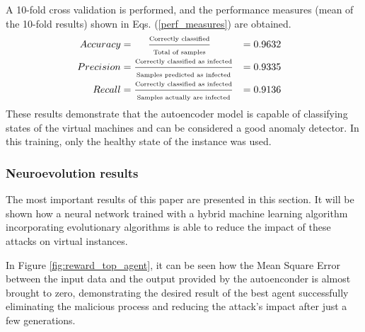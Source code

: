 \documentclass{iosart2c}
\begin{document}
A 10-fold cross validation is performed, and the performance measures (mean of the 10-fold results) shown in Eqs. (\ref{perf_measures}) are obtained.
\begin{eqnarray}\label{perf_measures}
\begin{aligned}
\hspace{-0.3cm} Accuracy  &= \hspace{0.5cm} \frac{\text{\tiny{Correctly classified}}}{\text{\tiny{Total of samples}}}           &= 0.9632 \\
\hspace{-0.3cm} Precision &=\frac{\text{\tiny{Correctly classified as infected}}}{\text{\tiny{Samples predicted as infected}}} &= 0.9335\\
\hspace{-0.3cm} Recall    &=\frac{\text{\tiny{Correctly classified as infected}}}{\text{\tiny{Samples actually are infected}}} &= 0.9136\\
\end{aligned}
\end{eqnarray}
These results demonstrate that the autoencoder model is capable of classifying states of the virtual machines and can be considered a good anomaly detector. In this training, only the healthy state of the instance was used.

\subsubsection{Neuroevolution results}

The most important results of this paper are presented in this section. It will be shown how a neural network trained with a hybrid machine learning algorithm incorporating evolutionary algorithms is able to reduce the impact of these attacks on virtual instances.

In Figure \ref{fig:reward_top_agent}, it can be seen how the Mean Square Error between the input data and the output provided by the autoenconder is almost brought to zero, demonstrating the desired result of the best agent successfully eliminating the malicious process and reducing the attack's impact after just a few generations.
\end{document}
